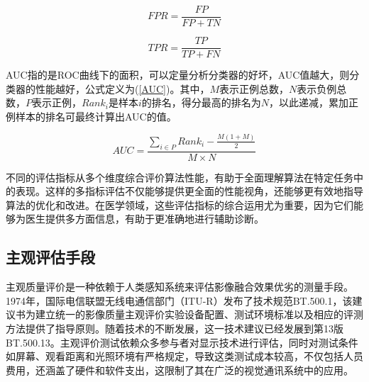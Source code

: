 \begin{equation}\label{FPR}
FPR=\frac{FP}{FP+TN}
\end{equation}

\begin{equation}\label{TPR}
TPR=\frac{TP}{TP+FN}
\end{equation}

AUC指的是ROC曲线下的面积，可以定量分析分类器的好坏，AUC值越大，则分类器的性能越好，公式定义为(\ref{AUC})。其中，$M$表示正例总数，$N$表示负例总数，$P$表示正例，$Rank_i$是样本$i$的排名，得分最高的排名为$N$，以此递减，累加正例样本的排名可最终计算出AUC的值。

\begin{equation}\label{AUC}
AUC=\frac{\sum_{i\in P}Rank_i-\frac{M(1+M)}{2}}{M\times N}
\end{equation}

不同的评估指标从多个维度综合评价算法性能，有助于全面理解算法在特定任务中的表现。这样的多指标评估不仅能够提供更全面的性能视角，还能够更有效地指导算法的优化和改进。在医学领域，这些评估指标的综合运用尤为重要，因为它们能够为医生提供多方面信息，有助于更准确地进行辅助诊断。


\subsection{主观评估手段}
主观质量评价是一种依赖于人类感知系统来评估影像融合效果优劣的测量手段。1974年，国际电信联盟无线电通信部门（ITU-R）发布了技术规范BT.500.1，该建议书为建立统一的影像质量主观评价实验设备配置、测试环境标准以及相应的评测方法提供了指导原则。随着技术的不断发展，这一技术建议已经发展到第13版BT.500.13\cite{radiocommunication2002methodology}。主观评价测试依赖众多参与者对显示技术进行评估，同时对测试条件如屏幕、观看距离和光照环境有严格规定，导致这类测试成本较高，不仅包括人员费用，还涵盖了硬件和软件支出，这限制了其在广泛的视觉通讯系统中的应用。

